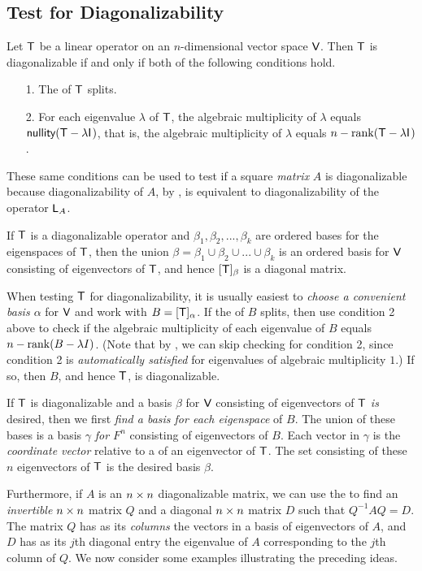 \subsection{Test for Diagonalizability} \label{sec 5.2.1}

Let \(\textsf{T}\) be a linear operator on an \(n\)-dimensional vector space \(\textsf{V}\).
Then \(\textsf{T}\) is diagonalizable if and only if both of the following conditions hold.
\begin{enumerate}
\item[1.] The \CPOLY{} of \(\textsf{T}\) splits. 
\item[2.] For each eigenvalue \(\lambda\) of \(\textsf{T}\), the algebraic multiplicity of \(\lambda\) equals \(\textsf{nullity}(\textsf{T} - \lambda \textsf{I}_{_{}})\), 
that is, the algebraic multiplicity of \(\lambda\) equals \(n - \mathrm{rank}(\textsf{T} - \lambda \textsf{I}_{_{}})\).
\end{enumerate}
These same conditions can be used to test if a square \emph{matrix} \(A\) is diagonalizable because diagonalizability of \(A\), by , is equivalent to diagonalizability of the operator \(\textsf{L}_A\).

If \(\textsf{T}\) is a diagonalizable operator and \(\beta_1, \beta_2, ..., \beta_k\) are ordered bases for the eigenspaces of \(\textsf{T}\), then the union \(\beta = \beta_1 \cup \beta_2 \cup ... \cup \beta_k\) is an ordered basis for \(\textsf{V}\) consisting of eigenvectors of \(\textsf{T}\),
and hence \([\textsf{T}]_{\beta}\) is a diagonal matrix.

When testing \(\textsf{T}\) for diagonalizability, it is usually easiest to \emph{choose a convenient basis \(\alpha\)} for \(\textsf{V}\) and work with \(B = [\textsf{T}]_{\alpha}\).
If the \CPOLY{} of \(B\) splits, then use condition 2 above to check if the algebraic multiplicity of each eigenvalue of \(B\) equals \(n - \mathrm{rank}(B - \lambda I)\).
(Note that by , we can skip checking for condition 2, since condition 2 is \emph{automatically satisfied} for eigenvalues of algebraic multiplicity \(1\).)
If so, then \(B\), and hence \(\textsf{T}\), is diagonalizable.

If \(\textsf{T}\) is diagonalizable and a basis \(\beta\) for \(\textsf{V}\) consisting of eigenvectors of \(\textsf{T}\) \emph{is} desired, then we first \emph{find a basis for each eigenspace} of \(B\).
The union of these bases is a basis \(\gamma\) \emph{for \(F^n\)} consisting of eigenvectors of \(B\).
Each vector in \(\gamma\) is the \emph{coordinate vector} relative to a of an eigenvector of \(\textsf{T}\).
The set consisting of these \(n\) eigenvectors of \(\textsf{T}\) is the desired basis \(\beta\).

Furthermore, if \(A\) is an \(n \times n\) diagonalizable matrix, we can use the  to find an \emph{invertible} \(n \times n\) matrix \(Q\) and a diagonal \(n \times n\) matrix \(D\) such that \(Q^{-1} A Q = D\).
The matrix \(Q\) has as its \emph{columns} the vectors in a basis of eigenvectors of \(A\), and \(D\) has as its \(j\)th diagonal entry the eigenvalue of \(A\) corresponding to the \(j\)th column of \(Q\).
We now consider some examples illustrating the preceding ideas.

